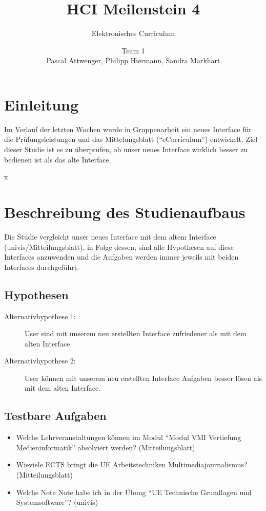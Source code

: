 \documentclass[a4paper,10pt]{scrartcl}
\title{HCI Meilenstein 4}
\subtitle{Elektronisches Curriculum}
\author{Team 1 \\Pascal Attwenger, Philipp Hiermann, Sandra Markhart}
\begin{document}
\maketitle

\section{Einleitung}

Im Verlauf der letzten Wochen wurde in Gruppenarbeit ein neues Interface für die Prüfungsleistungen und das Mittelungsblatt (``eCurriculum'') entwickelt.
Ziel dieser Studie ist es zu überprüfen, ob unser neues Interface wirklich besser zu bedienen ist als das alte Interface.

x

\section{Beschreibung des Studienaufbaus} 

Die Studie vergleicht unser neues Interface mit dem altem Interface (univis/Mitteilungsblatt), in Folge dessen, sind alle Hypothesen auf diese
Interfaces anzuwenden und die Aufgaben werden immer jeweils mit beiden Interfaces durchgeführt.

\subsection{Hypothesen}

\begin{description}
 \item[Alternativhypothese 1: ] User sind mit unserem neu erstellten Interface zufriedener als mit dem alten Interface. 
\end{description}

\begin{description}
 \item[Alternativhypothese 2: ] User können mit unserem neu erstellten Interface Aufgaben besser lösen als mit dem alten Interface. 
\end{description}

\subsection{Testbare Aufgaben}

\begin{itemize}
 \item Welche Lehrveranstaltungen können im Modul ``Modul VMI Vertiefung Medieninformatik'' absolviert werden? (Mitteilungsblatt)
 \item Wieviele ECTS bringt die UE Arbeitstechniken Multimediajournalismus? (Mitteilungsblatt)
 \item Welche Note Note habe ich in der Übung ``UE Technische Grundlagen und Systemsoftware''? (univis)
\end{itemize}
\end{document}
